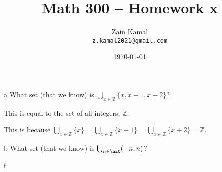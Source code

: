 \documentclass{article}
\title{Math 300 -- Homework x} %
\author{Zain Kamal\\ \texttt{z.kamal2021@gmail.com}} %
\date{\today} %
\begin{document}
\maketitle %


\section{} %

\begin{problem} a
What set (that we know) is $\bigcup _{x \in \mathbb{Z}} \{x, x + 1, x + 2\}$?
\end{problem}

\begin{solution}
This is equal to the set of all integers, $\mathbb{Z}$. 

This is because $\bigcup \limits_{x \in \mathbb{Z}} \{x\} = 
\bigcup \limits_{x \in \mathbb{Z}} \{x + 1\} =
\bigcup \limits_{x \in \mathbb{Z}} \{x + 2\} =
\mathbb{Z}$.
\end{solution}





\begin{problem} b
What set (that we know) is $\bigcup _{n \in \nat} (-n, n)$?
\end{problem}

\begin{solution}
f
\end{solution}





\
\hline



\end{document}
